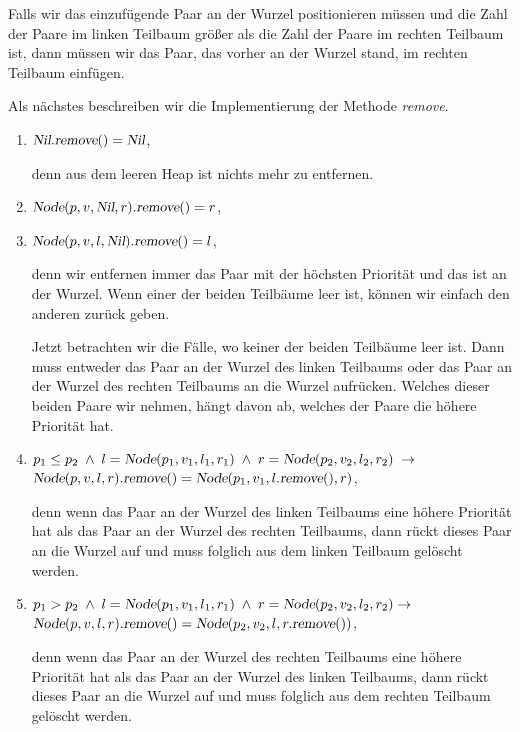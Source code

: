 \begin{enumerate}
      Falls wir das einzuf\"ugende Paar an der Wurzel
      positionieren m\"ussen und die Zahl der Paare im linken Teilbaum
      gr\"o\ss{}er als die Zahl der Paare im rechten Teilbaum ist,
      dann m\"ussen wir das Paar, das vorher an der Wurzel stand, im rechten Teilbaum
      einf\"ugen.
\end{enumerate}
Als n\"achstes beschreiben wir die Implementierung der Methode \textsl{remove}.
\begin{enumerate}
\item $\textsl{Nil}.\textsl{remove}() = \textsl{Nil}$,

      denn aus dem leeren Heap ist nichts mehr zu entfernen.
\item $\textsl{Node}(p,v,\textsl{Nil},r).\textsl{remove}() = r$,
  
\item $\textsl{Node}(p,v,l,\textsl{Nil}).\textsl{remove}() = l$,

      denn wir entfernen immer das Paar mit der h\"ochsten Priorit\"at und das ist an der
      Wurzel.  Wenn einer der beiden Teilb\"aume leer ist, k\"onnen wir einfach den anderen
      zur\"uck geben.

      Jetzt betrachten wir die F\"alle, wo keiner der beiden Teilb\"aume leer ist.
      Dann muss entweder das Paar an der Wurzel des linken Teilbaums
      oder das Paar an der Wurzel des rechten Teilbaums an die Wurzel aufr\"ucken.
      Welches dieser beiden Paare wir nehmen, h\"angt davon ab, welches der Paare die h\"ohere
      Priorit\"at hat.
\item $p_1 \leq p_2 \;\wedge\; l = \textsl{Node}(p_1,v_1,l_1,r_1) \;\wedge\; r =
      \textsl{Node}(p_2,v_2,l_2,r_2) \;\rightarrow$ \\[0.1cm] 
      \hspace*{1.3cm} 
      $\textsl{Node}(p,v,l,r).\textsl{remove}() =      \textsl{Node}(p_1,v_1,l.\textsl{remove}(),r)$,

      denn wenn das Paar an der Wurzel des linken Teilbaums eine h\"ohere Priorit\"at hat
      als das Paar an der Wurzel des rechten Teilbaums, dann r\"uckt dieses Paar an
      die Wurzel auf und muss folglich aus dem linken Teilbaum gel\"oscht werden.
\item $p_1 > p_2 \;\wedge\; l = \textsl{Node}(p_1,v_1,l_1,r_1) \;\wedge\; r = \textsl{Node}(p_2,v_2,l_2,r_2) \rightarrow$ \\[0.1cm]
      \hspace*{1.3cm} 
      $\textsl{Node}(p,v,l,r).\textsl{remove}() = \textsl{Node}(p_2,v_2,l,r.\textsl{remove}())$,

      denn wenn das Paar an der Wurzel des rechten Teilbaums eine h\"ohere Priorit\"at hat
      als das Paar an der Wurzel des linken Teilbaums, dann r\"uckt dieses Paar an
      die Wurzel auf und muss folglich aus dem rechten Teilbaum gel\"oscht werden.  
\end{enumerate}
